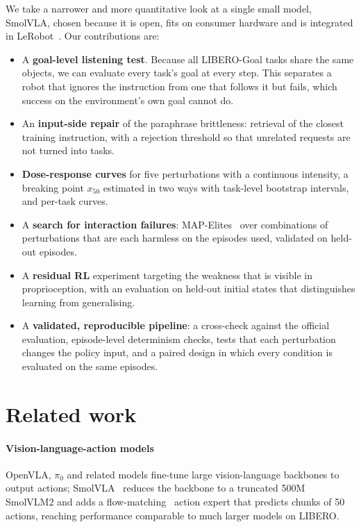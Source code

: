 \documentclass[10pt,twocolumn,letterpaper]{article}
\begin{document}
We take a narrower and more quantitative look at a single small model, SmolVLA, chosen because it is open,
fits on consumer hardware and is integrated in LeRobot~\citep{cadene2024lerobot}. Our contributions are:
\begin{itemize}
  \item A \textbf{goal-level listening test}. Because all LIBERO-Goal tasks share the same objects, we
  can evaluate every task's goal at every step. This separates a robot that ignores the instruction from
  one that follows it but fails, which success on the environment's own goal cannot do.
  \item An \textbf{input-side repair} of the paraphrase brittleness: retrieval of the closest training
  instruction, with a rejection threshold so that unrelated requests are not turned into tasks.
  \item \textbf{Dose-response curves} for five perturbations with a continuous intensity, a breaking
  point $x_{50}$ estimated in two ways with task-level bootstrap intervals, and per-task curves.
  \item A \textbf{search for interaction failures}: MAP-Elites~\citep{mouret2015mapelites} over combinations of
  perturbations that are each harmless on the episodes used, validated on held-out episodes.
  \item A \textbf{residual RL} experiment targeting the weakness that is visible in proprioception, with
  an evaluation on held-out initial states that distinguishes learning from generalising.
  \item A \textbf{validated, reproducible pipeline}: a cross-check against the official evaluation,
  episode-level determinism checks, tests that each perturbation changes the policy input, and a paired
  design in which every condition is evaluated on the same episodes.
\end{itemize}

\section{Related work}
\paragraph{Vision-language-action models} OpenVLA, $\pi_0$ and related models fine-tune large
vision-language backbones to output actions; SmolVLA~\citep{shukor2025smolvla} reduces the backbone to a
truncated 500M SmolVLM2 and adds a flow-matching~\citep{lipmanflow2022} action expert that predicts chunks
of 50 actions, reaching performance comparable to much larger models on LIBERO.
\end{document}
